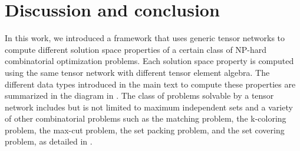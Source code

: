 \documentclass[review, onefignum, onetabnum]{siamart190516}
\begin{document}
\section{Discussion and conclusion}
In this work, we introduced a framework that uses generic tensor networks to compute different solution space properties of a certain class of NP-hard combinatorial optimization problems.
Each solution space property is computed using the same tensor network with different tensor element algebra.
The different data types introduced in the main text to compute these properties are summarized in the diagram in .
The class of problems solvable by a tensor network includes but is not limited to maximum independent sets and a variety of other combinatorial problems such as the matching problem, the k-coloring problem, the max-cut problem, the set packing problem, and the set covering problem, as detailed in . 

\end{document}
